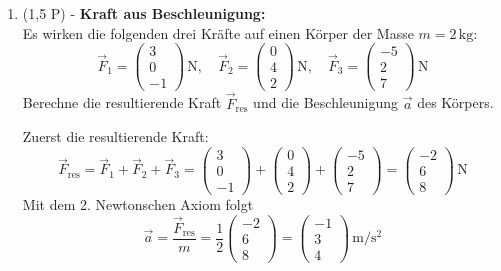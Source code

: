 \documentclass[11pt, a4paper]{article}
\begin{document}
\begin{enumerate}[label=\textbf{\arabic*.},itemsep=0.50cm]
    \item (1,5 P) - \textbf{Kraft aus Beschleunigung:} \\
    Es wirken die folgenden drei Kräfte auf einen Körper der Masse $m = 2\, \text{kg}$:
    \begin{equation*}
        \vec{F}_1 = \begin{pmatrix} 3 \\ 0 \\ -1 \end{pmatrix} \, \text{N}, \quad \vec{F}_2 = \begin{pmatrix} 0 \\ 4 \\ 2 \end{pmatrix} \, \text{N}, \quad \vec{F}_3 = \begin{pmatrix} -5 \\ 2 \\ 7 \end{pmatrix} \, \text{N}
    \end{equation*}
    Berechne die resultierende Kraft $\vec{F}_{\text{res}}$ und die Beschleunigung $\vec{a}$ des Körpers.
    \begin{solutionbox}
        Zuerst die resultierende Kraft:
        \[
        \vec{F}_{\text{res}} = \vec{F}_1 + \vec{F}_2 + \vec{F}_3
        = \begin{pmatrix} 3 \\ 0 \\ -1 \end{pmatrix} + \begin{pmatrix} 0 \\ 4 \\ 2 \end{pmatrix} + \begin{pmatrix} -5 \\ 2 \\ 7 \end{pmatrix}
        = \begin{pmatrix} -2 \\ 6 \\ 8 \end{pmatrix} \, \text{N}
        \]
        Mit dem 2. Newtonschen Axiom folgt
        \[
        \vec{a} = \frac{\vec{F}_{\text{res}}}{m} = \frac{1}{2} \begin{pmatrix} -2 \\ 6 \\ 8 \end{pmatrix}
        = \begin{pmatrix} -1 \\ 3 \\ 4 \end{pmatrix} \, \si{\meter\per\second\squared}
        \]
    \end{solutionbox}


\end{enumerate}
\end{document}
